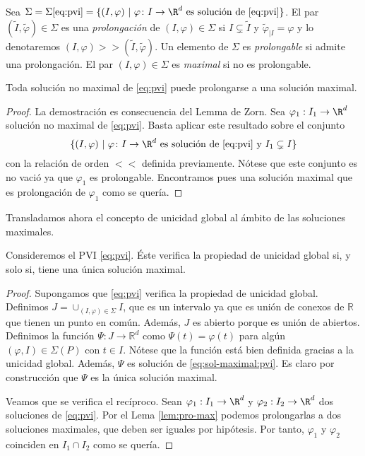 \documentclass{article}
\begin{document}
\begin{definition}
  Sea
  $\Sigma = \Sigma\eqref{eq:pvi} = \{(I, \varphi) \ | \ \varphi \colon I \to \R^d \text{ es solución de
    \eqref{eq:pvi}}\}$. El par $(\widetilde{I}, \widetilde{\varphi}) \in \Sigma$ es una
  \emph{prolongación} de $(I, \varphi) \in \Sigma$ si $I \subsetneq \widetilde{I}$ y
  $\widetilde{\varphi}_{|I} = \varphi$ y lo denotaremos
  $(I, \varphi) >> (\widetilde{I}, \tilde{\varphi})$. Un elemento de $\Sigma$ es \emph{prolongable}
  si admite una prolongación.  El par $(I, \varphi) \in \Sigma$ es \emph{maximal} si no es
  prolongable.
\end{definition}

\begin{lemma} \label{lem:pro-max} Toda solución no maximal de \eqref{eq:pvi} puede prolongarse a una
  solución maximal.
\end{lemma}
\begin{proof}
  La demostración es consecuencia del Lemma de Zorn. Sea $\varphi_1: I_1 \to \R^d$ solución no
  maximal de \eqref{eq:pvi}. Basta aplicar este resultado sobre el conjunto
  \[ \{(I, \varphi) \ | \ \varphi \colon I \to \R^d \text{ es solución de \eqref{eq:pvi}} \text{ y } I_1
    \subsetneq I\} \] con la relación de orden $<<$ definida previamente. Nótese que este conjunto
  es no vació ya que $\varphi_1$ es prolongable. Encontramos pues una solución maximal que es
  prolongación de $\varphi_1$ como se quería.
\end{proof}

Transladamos ahora el concepto de unicidad global al ámbito de las soluciones maximales.

\begin{prop} \label{prop:unicidad-maximal} Consideremos el PVI \eqref{eq:pvi}. Éste verifica la
  propiedad de unicidad global si, y solo si, tiene una única solución maximal.
\end{prop}
\begin{proof}
  Supongamos que \eqref{eq:pvi} verifica la propiedad de unicidad global. Definimos
  $J = \cup_{(I, \varphi) \in \Sigma} I$, que es un intervalo ya que es unión de conexos de
  $\mathbb{R}$ que tienen un punto en común. Además, $J$ es abierto porque es unión de
  abiertos. Definimos la función $\Psi : J \to \mathbb{R}^d$ como $\Psi(t) = \varphi(t)$ para algún
  $(\varphi, I) \in \Sigma(P)$ con $t \in I$. Nótese que la función está bien definida gracias a la
  unicidad global. Además, $\Psi$ es solución de \eqref{eq:sol-maximal:pvi}. Es claro por
  construcción que $\Psi$ es la única solución maximal.

  Veamos que se verifica el recíproco. Sean $\varphi_1: I_1 \to \R^d$ y $\varphi_2: I_2 \to \R^d$
  dos soluciones de \eqref{eq:pvi}. Por el Lema \ref{lem:pro-max} podemos prolongarlas a dos
  soluciones maximales, que deben ser iguales por hipótesis. Por tanto, $\varphi_1$ y $\varphi_2$
  coinciden en $I_1 \cap I_2$ como se quería.
\end{proof}
\end{document}
